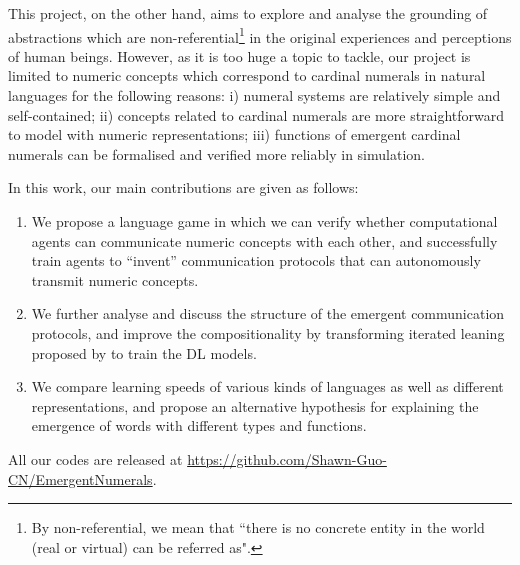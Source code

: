 This project, on the other hand, aims to explore and analyse the grounding of abstractions which are non-referential\footnote{By non-referential, we mean that ``there is no concrete entity in the world (real or virtual) can be referred as".} in the original experiences and perceptions of human beings. However, as it is too huge a topic to tackle, our project is limited to numeric concepts which correspond to cardinal numerals in natural languages for the following reasons: i) numeral systems are relatively simple and self-contained\cite{james1999numeral}; ii) concepts related to cardinal numerals are more straightforward to model with numeric representations; iii) functions of emergent cardinal numerals can be formalised and verified more reliably in simulation.

In this work, our main contributions are given as follows:

\begin{enumerate}
  \item We propose a language game in which we can verify whether computational agents can communicate numeric concepts with each other, and successfully train agents to ``invent'' communication protocols that can autonomously transmit numeric concepts.
  \item We further analyse and discuss the structure of the emergent communication protocols, and improve the compositionality by transforming iterated leaning proposed by \cite{smith2003iterated} to train the DL models.
  \item We compare learning speeds of various kinds of languages as well as different representations, and propose an alternative hypothesis for explaining the emergence of words with different types and functions.
\end{enumerate}

All our codes are released at \href{https://github.com/Shawn-Guo-CN/EmergentNumerals}{https://github.com/Shawn-Guo-CN/EmergentNumerals}.